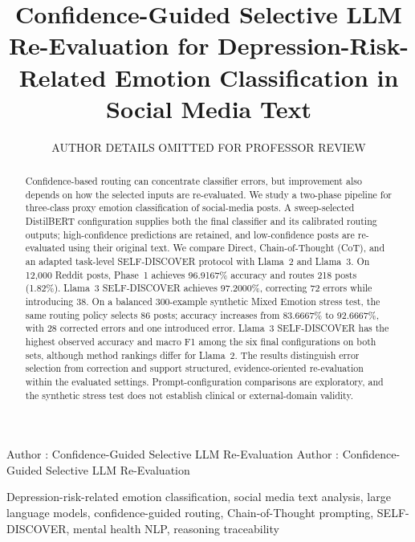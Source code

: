 \documentclass{ieeeaccess}
\begin{document}
\history{}
\doi{}

\title{Confidence-Guided Selective LLM Re-Evaluation for Depression-Risk-Related Emotion Classification in Social Media Text}
\author{\uppercase{Author Details Omitted for Professor Review}}
\address[1]{Affiliation details will be inserted in the submission version.}
\markboth
{Author \headeretal: Confidence-Guided Selective LLM Re-Evaluation}
{Author \headeretal: Confidence-Guided Selective LLM Re-Evaluation}

\begin{abstract}
Confidence-based routing can concentrate classifier errors, but improvement also depends on how the selected inputs are re-evaluated. We study a two-phase pipeline for three-class proxy emotion classification of social-media posts. A sweep-selected DistilBERT configuration supplies both the final classifier and its calibrated routing outputs; high-confidence predictions are retained, and low-confidence posts are re-evaluated using their original text. We compare Direct, Chain-of-Thought (CoT), and an adapted task-level SELF-DISCOVER protocol with Llama~2 and Llama~3. On 12,000 Reddit posts, Phase~1 achieves 96.9167\% accuracy and routes 218 posts (1.82\%). Llama~3 SELF-DISCOVER achieves 97.2000\%, correcting 72 errors while introducing 38. On a balanced 300-example synthetic Mixed Emotion stress test, the same routing policy selects 86 posts; accuracy increases from 83.6667\% to 92.6667\%, with 28 corrected errors and one introduced error. Llama~3 SELF-DISCOVER has the highest observed accuracy and macro F1 among the six final configurations on both sets, although method rankings differ for Llama~2. The results distinguish error selection from correction and support structured, evidence-oriented re-evaluation within the evaluated settings. Prompt-configuration comparisons are exploratory, and the synthetic stress test does not establish clinical or external-domain validity.
\end{abstract}
\begin{keywords}
Depression-risk-related emotion classification, social media text analysis, large language models, confidence-guided routing, Chain-of-Thought prompting, SELF-DISCOVER, mental health NLP, reasoning traceability
\end{keywords}
\end{document}
